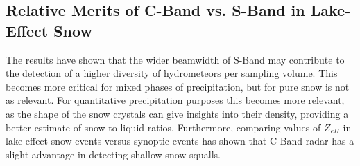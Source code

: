 \subsection{Relative Merits of C-Band vs. S-Band in Lake-Effect Snow}
The results have shown that the wider beamwidth of S-Band may contribute to the detection of a higher diversity of hydrometeors per sampling volume. This
becomes more critical for mixed phases of precipitation, but for pure snow is not as relevant. For quantitative precipitation purposes this becomes more
relevant, as the shape of the snow crystals can give insights into their density, providing a better estimate of snow-to-liquid ratios. Furthermore,
comparing values of $Z_{eH}$ in lake-effect snow events versus synoptic events has shown that C-Band radar has a slight advantage in detecting shallow snow-squalls.

